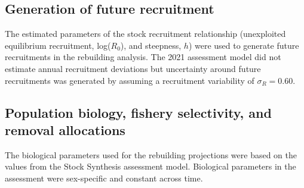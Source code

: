 \documentclass[11pt,
  english,
  a4paper,
]{article}
\begin{document}
\leavevmode\tagmcend\tagstructend\par


\hypertarget{generation-of-future-recruitment}{%
\subsection{Generation of future recruitment}\label{generation-of-future-recruitment}}

\leavevmode\tagmcend\tagstructend


The estimated parameters of the stock recruitment relationship (unexploited equilibrium recruitment, log({\(R_0\)\leavevmode\tagmcend\tagstructend}), and steepness, {\(h\)\leavevmode\tagmcend\tagstructend}) were used to generate future recruitments in the rebuilding analysis. The 2021 assessment model did not estimate annual recruitment deviations but uncertainty around future recruitments was generated by assuming a recruitment variability of {\(\sigma_R = 0.60\)\leavevmode\tagmcend\tagstructend}.

\leavevmode\tagmcend\tagstructend\par


\hypertarget{population-biology-fishery-selectivity-and-removal-allocations}{%
\subsection{Population biology, fishery selectivity, and removal allocations}\label{population-biology-fishery-selectivity-and-removal-allocations}}

\leavevmode\tagmcend\tagstructend


The biological parameters used for the rebuilding projections were based on the values from the Stock Synthesis assessment model. Biological parameters in the assessment were sex-specific and constant across time.

\leavevmode\tagmcend\tagstructend\par

\end{document}
